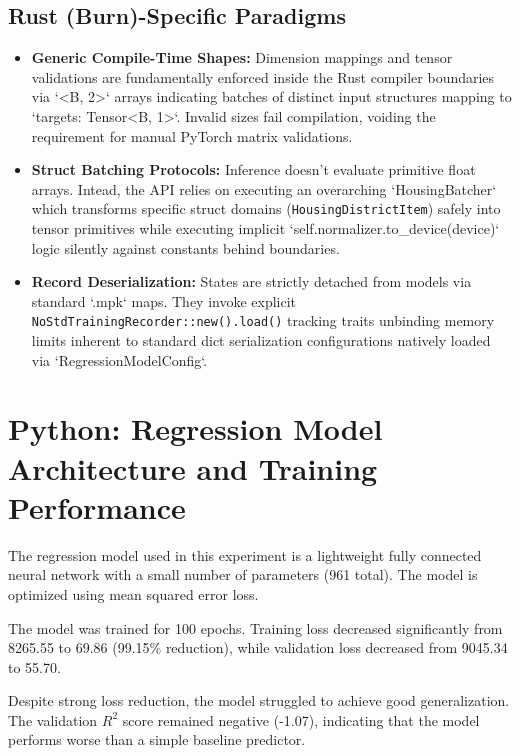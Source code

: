 \documentclass[12pt]{article}
\begin{document}
\subsection{Rust (Burn)-Specific Paradigms}
\begin{itemize}
    \item \textbf{Generic Compile-Time Shapes:} Dimension mappings and tensor validations are fundamentally enforced inside the Rust compiler boundaries via `<B, 2>` arrays indicating batches of distinct input structures mapping to `targets: Tensor<B, 1>`. Invalid sizes fail compilation, voiding the requirement for manual PyTorch matrix validations.
    \item \textbf{Struct Batching Protocols:} Inference doesn't evaluate primitive float arrays. Intead, the API relies on executing an overarching `HousingBatcher` which transforms specific struct domains (\texttt{HousingDistrictItem}) safely into tensor primitives while executing implicit `self.normalizer.to\_device(device)` logic silently against constants behind boundaries.
    \item \textbf{Record Deserialization:} States are strictly detached from models via standard `.mpk` maps. They invoke explicit \texttt{NoStdTrainingRecorder::new().load()} tracking traits unbinding memory limits inherent to standard dict serialization configurations natively loaded via `RegressionModelConfig`.
\end{itemize}

\newpage
\section{Python: Regression Model Architecture and Training Performance}

The regression model used in this experiment is a lightweight fully connected neural network with a small number of parameters (961 total). The model is optimized using mean squared error loss.



The model was trained for 100 epochs. Training loss decreased significantly from 8265.55 to 69.86 (99.15\% reduction), while validation loss decreased from 9045.34 to 55.70.

Despite strong loss reduction, the model struggled to achieve good generalization. The validation $R^2$ score remained negative (-1.07), indicating that the model performs worse than a simple baseline predictor.
\end{document}
